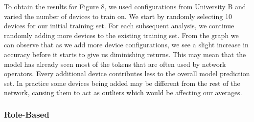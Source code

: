 To obtain the results for Figure 8, we used configurations from University B and varied the number of devices to train on. We start by randomly selecting 10 devices for our initial training set. For each subsequent analysis, we continue randomly adding more devices to the existing training set. From the graph we can observe that as we add more device configurations, we see a slight increase in accuracy before it starts to give us diminishing returns. This may mean that the model has already seen most of the tokens that are often used by network operators. Every additional device contributes less to the overall model prediction set. In practice some devices being added may be different from the rest of the network, causing them to act as outliers which would be affecting our averages.

\subsubsection{Role-Based}

